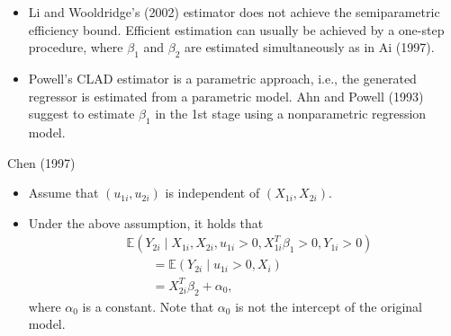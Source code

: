 \documentclass[xcolor=svgnames,dvipdfmx,cjk]{beamer}
\theoremstyle{example}
\def\E{\mathbb{E}}
\begin{document}
\begin{frame}
      \begin{itemize}
            \item Li and Wooldridge's (2002) estimator does not achieve the semiparametric efficiency bound.
                  Efficient estimation can usually be achieved by a one-step procedure, 
                  where $\beta_1$ and $\beta_2$ are estimated simultaneously as in Ai (1997).
            \item Powell's CLAD estimator is a parametric approach, i.e., 
                  the generated regressor is estimated from a parametric model.
                  Ahn and Powell (1993) suggest to estimate $\beta_1$ in the 1st stage using a nonparametric regression model.
      \end{itemize}
\end{frame}


\begin{frame}{Chen (1997)}
      \begin{itemize}
            \item Assume that $(u_{1i}, u_{2i})$ is independent of $(X_{1i}, X_{2i})$.
            \item Under the above assumption, it holds that
                  \begin{align*}
                        &\E(Y_{2i} \mid X_{1i}, X_{2i}, u_{1i}>0, X_{1i}^T\beta_1>0, Y_{1i}>0) \\
                        &\qquad= \E(Y_{2i} \mid u_{1i}>0, X_i) \\
                        &\qquad= X_{2i}^T \beta_2 + \alpha_0,
                  \end{align*}
                  where $\alpha_0$ is a constant. 
                  Note that $\alpha_0$ is not the intercept of the original model.
            
      \end{itemize}
\end{frame}
\end{document}
